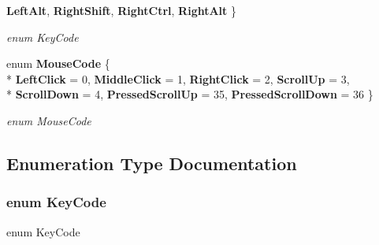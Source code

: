 \begin{DoxyCompactItemize}
{\bf Left\+Alt}, 
{\bf Right\+Shift}, 
{\bf Right\+Ctrl}, 
{\bf Right\+Alt}
 \}
\begin{DoxyCompactList}\small\item\em enum Key\+Code \end{DoxyCompactList}\item 
enum {\bf Mouse\+Code} \{ \\*
{\bf Left\+Click} = 0, 
{\bf Middle\+Click} = 1, 
{\bf Right\+Click} = 2, 
{\bf Scroll\+Up} = 3, 
\\*
{\bf Scroll\+Down} = 4, 
{\bf Pressed\+Scroll\+Up} = 35, 
{\bf Pressed\+Scroll\+Down} = 36
 \}
\begin{DoxyCompactList}\small\item\em enum Mouse\+Code \end{DoxyCompactList}\end{DoxyCompactItemize}


\subsection{Enumeration Type Documentation}
\subsubsection[{Key\+Code}]{\setlength{\rightskip}{0pt plus 5cm}enum {\bf Key\+Code}}\label{_input_engine_8h_a7885f47644a0388f981f416fa20389b2}


enum Key\+Code 

